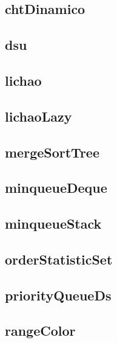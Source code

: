 \subsection{chtDinamico}
\raggedbottom
\hrulefill
\subsection{dsu}
\raggedbottom
\hrulefill
\subsection{lichao}
\raggedbottom
\hrulefill
\subsection{lichaoLazy}
\raggedbottom
\hrulefill
\subsection{mergeSortTree}
\raggedbottom
\hrulefill
\subsection{minqueueDeque}
\raggedbottom
\hrulefill
\subsection{minqueueStack}
\raggedbottom
\hrulefill
\subsection{orderStatisticSet}
\raggedbottom
\hrulefill
\subsection{priorityQueueDs}
\raggedbottom
\hrulefill
\subsection{rangeColor}
\raggedbottom
\hrulefill
